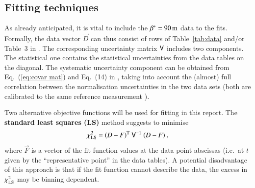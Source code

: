 \subsection{Fitting techniques}
\label{sec:cni fit techniques}

As already anticipated, it is vital to include the $\beta^* = 90\,{\rm m}$ data to the fits. Formally, the data vector $\vec D$ can thus consist of rows of Table~\ref{tab:data} and/or Table~3 in \cite{8tev-90m}. The corresponding uncertainty matrix $\mathsf{V}$ includes two components. The statistical one contains the statistical uncertainties from the data tables on the diagonal. The systematic uncertainty component can be obtained from Eq.~(\ref{eq:covar mat}) and Eq.~(14) in \cite{8tev-90m}, taking into account the (almost) full correlation between the normalisation uncertainties in the two data sets (both are calibrated to the same reference measurement \cite{prl111}).



Two alternative objective functions will be used for fitting in this report. The {\bf standard least squares (LS)} method suggests to minimise
\begin{equation}
\label{eq:chi sq LS}
	\chi_{\rm LS}^2 = (D - F)^{\rm T}\ \mathsf{V}^{-1}\ (D - F)\ ,
\end{equation}
where $\vec F$ is a vector of the fit function values at the data point abscissas (i.e.~at $t$ given by the ``representative point'' in the data tables). A potential disadvantage of this approach is that if the fit function cannot describe the data, the excess in $\chi^2_{\rm LS}$ may be binning dependent.


